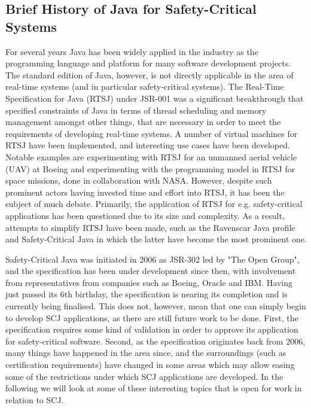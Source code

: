 \subsection{Brief History of Java for Safety-Critical Systems} %
\label{sub:brief_history_of_java_for_safety_critical_systems}
For several years Java has been widely applied in the industry as the programming language and platform for many software development projects. The standard edition of Java, however, is not directly applicable in the area of real-time systems (and in particular safety-critical systems). The Real-Time Specification for Java (RTSJ) under JSR-001\cite{alan2001real}\cite{henties:2009-20} was a significant breakthrough that specified constraints of Java in terms of thread scheduling and memory management amongst other things, that are necessary in order to meet the requirements of developing real-time systems. A number of virtual machines for RTSJ have been implemented, and interesting use cases have been developed. Notable examples are experimenting with RTSJ for an unmanned aerial vehicle (UAV) at Boeing\cite{Armbruster:2007:RJV:1324969.1324974} and experimenting with the programming model in RTSJ for space missions, done in collaboration with NASA\cite{DBLP:conf/isorc/DvorakBCCCGIMMR04}. However, despite such prominent actors having invested time and effort into RTSJ, it has been the subject of much debate. Primarily, the application of RTSJ for e.g. safety-critical applications has been questioned due to its size and complexity. As a result, attempts to simplify RTSJ have been made, such as the Ravenscar Java profile and Safety-Critical Java in which the latter have become the most prominent one.

Safety-Critical Java was initiated in 2006 as JSR-302 led by "The Open Group", and the specification has been under development since then, with involvement from representatives from companies such as Boeing, Oracle and IBM. Having just passed its 6th birthday, the specification is nearing its completion and is currently being finalised. This does not, however, mean that one can simply begin to develop SCJ applications, as there are still future work to be done. First, the specification requires some kind of validation in order to approve its application for safety-critical software. Second, as the specification originates back from 2006, many things have happened in the area since, and the surroundings (such as certification requirements) have changed in some areas which may allow easing some of the restrictions under which SCJ applications are developed. In the following we will look at some of these interesting topics that is open for work in relation to SCJ.

